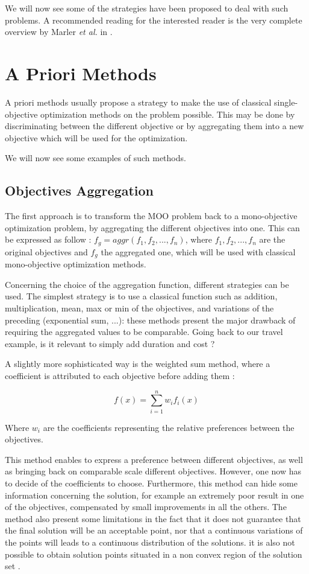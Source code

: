 We will now see some of the strategies have been proposed to deal with such problems. A recommended reading for the interested reader is the very complete overview by Marler \emph{et al.} in \cite{marler2004survey}. 

\section{A Priori Methods}

A priori methods usually propose a strategy  to make the use of classical single-objective optimization methods on the problem possible. This may be done by discriminating between the different objective or by aggregating them into a new objective which will be used for the optimization.

We will now see some examples of such methods.

\subsection{Objectives Aggregation}

The first approach is to transform the MOO problem back to a mono-objective optimization problem, by aggregating the different objectives into one. This can be expressed as follow : \(f_g = aggr(f_1, f_2, ..., f_n)\), where \(f_1, f_2, ..., f_n\) are the original objectives and \(f_g\) the aggregated one, which will be used with classical mono-objective optimization methods.

Concerning the choice of the aggregation function, different strategies can be used. The simplest strategy is to use a classical function such as addition, multiplication, mean, max or min of the objectives, and variations of the preceding (exponential sum, ...): these methods present the major drawback of requiring the aggregated values to be comparable. Going back to our travel example, is it relevant to simply add duration and cost ?

A slightly more sophisticated way is the weighted sum method, where a coefficient is attributed to each objective before adding them \cite{Marler2010} :

\[ f(x) =\displaystyle\sum_{i=1}^n w_i f_i(x) \]

Where $w_i$ are the coefficients representing the relative preferences between the objectives.

This method enables to express a preference between different objectives, as well as bringing back on comparable scale different objectives. However, one now has to decide of the coefficients to choose. Furthermore, this method can hide some information concerning the solution, for example an extremely poor result in one of the objectives, compensated by small improvements in all the others.  The method also present some limitations in the fact that it does not guarantee that the final solution will be an acceptable point, nor that a continuous variations of the points will leads to a continuous distribution of the solutions. it is also not possible to obtain solution points situated in a non convex region of the solution set \cite{marler2004survey}.

